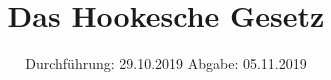 

\subject{V803}
\title{Das Hookesche Gesetz}
\date{%
  Durchführung: 29.10.2019
  \hspace{3em}
  Abgabe: 05.11.2019
}



\maketitle
\thispagestyle{empty}
\tableofcontents
\newpage





\printbibliography{}


